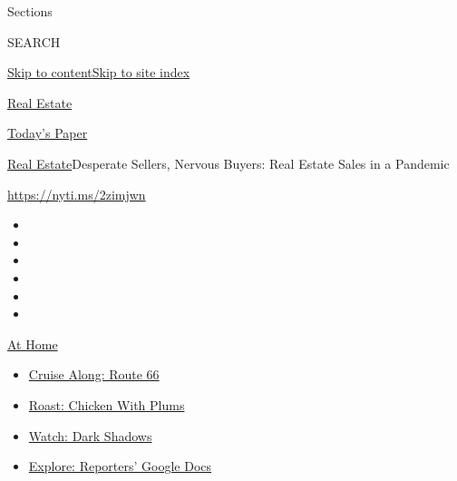 Sections

SEARCH

\protect\hyperlink{site-content}{Skip to
content}\protect\hyperlink{site-index}{Skip to site index}

\href{https://www.nytimes3xbfgragh.onion/section/realestate}{Real
Estate}

\href{https://myaccount.nytimes3xbfgragh.onion/auth/login?response_type=cookie\&client_id=vi}{}

\href{https://www.nytimes3xbfgragh.onion/section/todayspaper}{Today's
Paper}

\href{/section/realestate}{Real Estate}\textbar{}Desperate Sellers,
Nervous Buyers: Real Estate Sales in a Pandemic

\url{https://nyti.ms/2zimjwn}

\begin{itemize}
\item
\item
\item
\item
\item
\item
\end{itemize}

\href{https://www.nytimes3xbfgragh.onion/spotlight/at-home?action=click\&pgtype=Article\&state=default\&region=TOP_BANNER\&context=at_home_menu}{At
Home}

\begin{itemize}
\tightlist
\item
  \href{https://www.nytimes3xbfgragh.onion/2020/09/07/travel/route-66.html?action=click\&pgtype=Article\&state=default\&region=TOP_BANNER\&context=at_home_menu}{Cruise
  Along: Route 66}
\item
  \href{https://www.nytimes3xbfgragh.onion/2020/09/04/dining/sheet-pan-chicken.html?action=click\&pgtype=Article\&state=default\&region=TOP_BANNER\&context=at_home_menu}{Roast:
  Chicken With Plums}
\item
  \href{https://www.nytimes3xbfgragh.onion/2020/09/04/arts/television/dark-shadows-stream.html?action=click\&pgtype=Article\&state=default\&region=TOP_BANNER\&context=at_home_menu}{Watch:
  Dark Shadows}
\item
  \href{https://www.nytimes3xbfgragh.onion/interactive/2020/at-home/even-more-reporters-editors-diaries-lists-recommendations.html?action=click\&pgtype=Article\&state=default\&region=TOP_BANNER\&context=at_home_menu}{Explore:
  Reporters' Google Docs}
\end{itemize}

